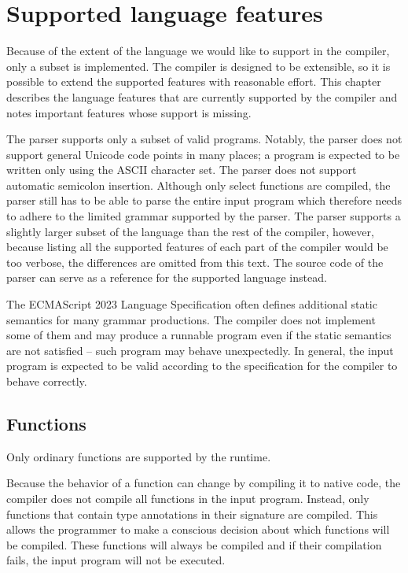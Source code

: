 \chapter{Supported language features}\label{chap:supported_lang}

Because of the extent of the language we would like to support in the compiler, only a subset is implemented. The compiler is designed to be extensible, so it is possible to extend the supported features with reasonable effort. This chapter describes the language features that are currently supported by the compiler and notes important features whose support is missing.

The parser supports only a subset of valid programs. Notably, the parser does not support general Unicode code points in many places; a program is expected to be written only using the ASCII character set. The parser does not support automatic semicolon insertion. Although only select functions are compiled, the parser still has to be able to parse the entire input program which therefore needs to adhere to the limited grammar supported by the parser. The parser supports a slightly larger subset of the language than the rest of the compiler, however, because listing all the supported features of each part of the compiler would be too verbose, the differences are omitted from this text. The source code of the parser can serve as a reference for the supported language instead.

The ECMAScript 2023 Language Specification\cite{ecma262} often defines additional static semantics for many grammar productions. The compiler does not implement some of them and may produce a runnable program even if the static semantics are not satisfied -- such program may behave unexpectedly. In general, the input program is expected to be valid according to the specification for the compiler to behave correctly.


\section{Functions}

Only ordinary functions are supported by the runtime.

Because the behavior of a function can change by compiling it to native code, the compiler does not compile all functions in the input program. Instead, only functions that contain type annotations in their signature are compiled. This allows the programmer to make a conscious decision about which functions will be compiled. These functions will always be compiled and if their compilation fails, the input program will not be executed.

